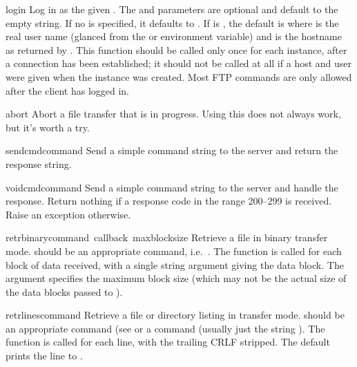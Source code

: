 \begin{funcdesc}{login}{}
Log in as the given .  The  and 
parameters are optional and default to the empty string.  If no
 is specified, it defaults to .  If
 is , the default  is
 where  is the real user
name (glanced from the  or  environment
variable) and  is the hostname as returned by
.  This function should be called only
once for each instance, after a connection has been established; it
should not be called at all if a host and user were given when the
instance was created.  Most FTP commands are only allowed after the
client has logged in.
\end{funcdesc}

\begin{funcdesc}{abort}{}
Abort a file transfer that is in progress.  Using this does not always
work, but it's worth a try.
\end{funcdesc}

\begin{funcdesc}{sendcmd}{command}
Send a simple command string to the server and return the response
string.
\end{funcdesc}

\begin{funcdesc}{voidcmd}{command}
Send a simple command string to the server and handle the response.
Return nothing if a response code in the range 200--299 is received.
Raise an exception otherwise.
\end{funcdesc}

\begin{funcdesc}{retrbinary}{command\, callback\, maxblocksize}
Retrieve a file in binary transfer mode.   should be an
appropriate  command, i.e.\ .
The  function is called for each block of data received,
with a single string argument giving the data block.
The  argument specifies the maximum block size
(which may not be the actual size of the data blocks passed to
).
\end{funcdesc}

\begin{funcdesc}{retrlines}{command}
Retrieve a file or directory listing in \ASCII{} transfer mode.
 should be an appropriate  command (see
 or a  command (usually just the string
).  The  function is called for each line,
with the trailing CRLF stripped.  The default  prints
the line to .
\end{funcdesc}

